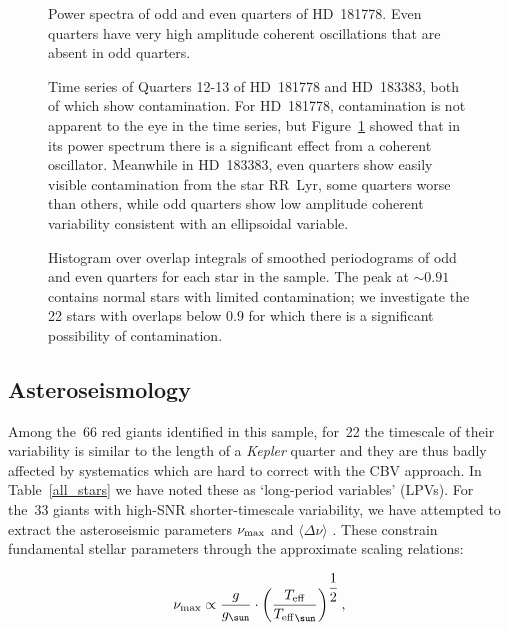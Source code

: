 \documentclass[modern]{aastex62}
\newcommand{\numax}{\mbox{$\nu_{\rm max}$}\xspace}
\newcommand{\Dnu}{\mbox{$\Delta \nu$}\xspace}
\newcommand{\teff}{\mbox{$T_{\rm eff}$}\xspace}
\newcommand{\kepler}{\textit{Kepler}\xspace}
\begin{document}
\begin{figure}
\caption{\label{contamination}
Power spectra of odd and even quarters of HD~181778. Even quarters have very high amplitude coherent oscillations that are absent in odd quarters.}
\end{figure}

\begin{figure}
\caption{\label{contamination_timeseries}
Time series of Quarters 12-13 of HD~181778 and HD~183383, both of which show contamination. For HD~181778, contamination is not apparent to the eye in the time series, but Figure~\ref{contamination} showed that in its power spectrum there is a significant effect from a coherent oscillator. Meanwhile in HD~183383, even quarters show easily visible contamination from the star RR~Lyr, some quarters worse than others, while odd quarters show low amplitude coherent variability consistent with an ellipsoidal variable.} 
\end{figure}

\begin{figure}
\caption{\label{contamination2}
Histogram over overlap integrals of smoothed periodograms of odd and even quarters for each star in the sample. The peak at $\sim 0.91$ contains normal stars with limited contamination; we investigate the 22 stars with overlaps below 0.9 for which there is a significant possibility of contamination.}
\end{figure}

\subsection{Asteroseismology}
\label{asteroseismology}

Among the~66 red giants identified in this sample, for~22 the timescale of their variability is similar to the length of a \kepler quarter and they are thus badly affected by systematics which are hard to correct with the CBV approach. In Table~\ref{all_stars} we have noted these as `long-period variables' (LPVs). For the~33 giants with high-SNR shorter-timescale variability, we have attempted to extract the asteroseismic parameters \numax and $\langle \Dnu \rangle$ \citep{KB95,2013ARA&A..51..353C}. These constrain fundamental stellar parameters through the approximate scaling relations: 

\begin{equation}
\label{scaling}
\numax \propto \dfrac{g}{g_{\sun}} \cdot \left(\dfrac{\teff}{\teff_{\sun}}\right)^{\dfrac{1}{2}},
\end{equation}
\end{document}
